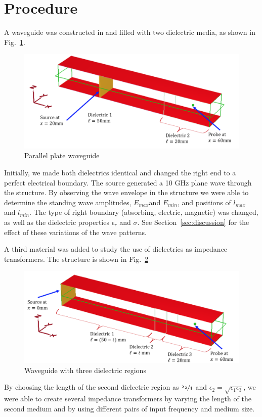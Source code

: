 \section{Procedure}\label{sec:procedure}
A waveguide was constructed in \mefisto{} and filled with two dielectric media, as shown in Fig.~\ref{fig:waveguide}.

\begin{figure}[tbph]
	\centering
	\includegraphics[width=0.7\linewidth]{graphics/waveguide}
	\caption{Parallel plate waveguide}
	\label{fig:waveguide}
\end{figure}

Initially, we made both dielectrics identical and changed the right end to a perfect electrical boundary.
The source generated a 10 GHz plane wave through the structure.
By observing the wave envelope in the structure we were able to determine the standing wave amplitudes, $E_{max} $and $E_{min}$, and positions of $l_{max}$ and $l_{min}$.
The type of right boundary (absorbing, electric, magnetic) was changed, as well as the dielectric properties $\epsilon_r$ and $\sigma$.
See Section~\ref{sec:discussion} for the effect of these variations of the wave patterns.

\pagebreak 
 
A third material was added to study the use of dielectrics as impedance transformers.
The structure is shown in Fig.~\ref{fig:waveguide_3dielectrics}

\begin{figure}[tbph]
	\centering
	\includegraphics[width=0.7\linewidth]{graphics/waveguide_3dielectrics}
	\caption{Waveguide with three dielectric regions}
	\label{fig:waveguide_3dielectrics}
\end{figure}

By choosing the length of the second dielectric region as $\sfrac{\lambda_2}{4}$ and $\epsilon_2 = \sqrt{\epsilon_1 \epsilon_3}$, we were able to create several impedance transformers by varying the length of the second medium and by using different pairs of input frequency and medium size.
